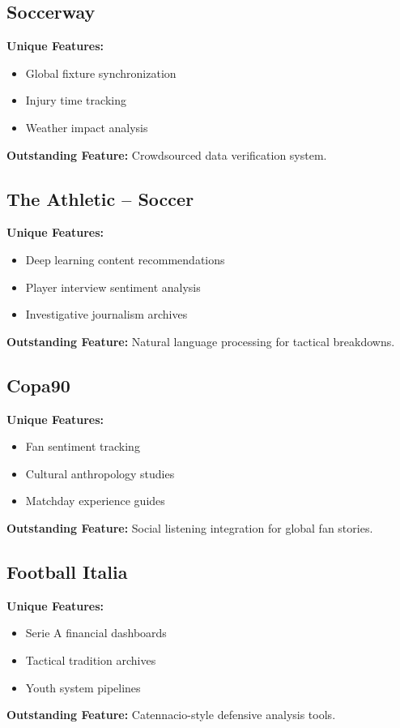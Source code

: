 \documentclass{report}
\begin{document}
\subsection{Soccerway}
\textbf{Unique Features:}
\begin{itemize}
    \item Global fixture synchronization
    \item Injury time tracking
    \item Weather impact analysis
\end{itemize}
\textbf{Outstanding Feature:} Crowdsourced data verification system\citep{soccerway}.

\subsection{The Athletic – Soccer}
\textbf{Unique Features:}
\begin{itemize}
    \item Deep learning content recommendations
    \item Player interview sentiment analysis
    \item Investigative journalism archives
\end{itemize}
\textbf{Outstanding Feature:} Natural language processing for tactical breakdowns\citep{athletic}.

\subsection{Copa90}
\textbf{Unique Features:}
\begin{itemize}
    \item Fan sentiment tracking
    \item Cultural anthropology studies
    \item Matchday experience guides
\end{itemize}
\textbf{Outstanding Feature:} Social listening integration for global fan stories\citep{copa90}.

\subsection{Football Italia}
\textbf{Unique Features:}
\begin{itemize}
    \item Serie A financial dashboards
    \item Tactical tradition archives
    \item Youth system pipelines
\end{itemize}
\textbf{Outstanding Feature:} Catennacio-style defensive analysis tools\citep{footballitalia}.
\end{document}

